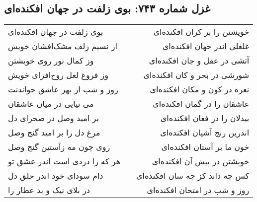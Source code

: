\begin{center}
\section*{غزل شماره ۷۴۳: بوی زلفت در جهان افکنده‌ای}
\label{sec:743}
\begin{longtable}{l p{0.5cm} r}
بوی زلفت در جهان افکنده‌ای
&&
خویشتن را بر کران افکنده‌ای
\\
از نسیم زلف مشک‌افشان خویش
&&
غلغلی اندر جهان افکنده‌ای
\\
وز کمال نور روی خویشتن
&&
آتشی در عقل و جان افکنده‌ای
\\
وز فروغ لعل روح‌افزای خویش
&&
شورشی در بحر و کان افکنده‌ای
\\
روز و شب از بهر عاشق خواندنت
&&
نعره در کون و مکان افکنده‌ای
\\
می نیایی در میان عاشقان
&&
عاشقان را در گمان افکنده‌ای
\\
بر امید وصل در صحرای دل
&&
بیدلان را در فغان افکنده‌ای
\\
مرغ دل را بر امید گنج وصل
&&
اندرین رنج آشیان افکنده‌ای
\\
روی چون مه زآستین گنج وصل
&&
خون ما بر آستان افکنده‌ای
\\
هر که را دردی است اندر عشق تو
&&
خویشتن در پیش آن افکنده‌ای
\\
دام سودای خود اندر حلق دل
&&
کس چه داند کز چه سان افکنده‌ای
\\
در بلای نیک و بد عطار را
&&
روز و شب در امتحان افکنده‌ای
\\
\end{longtable}
\end{center}

